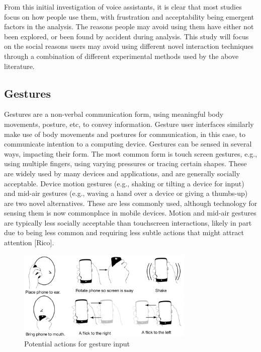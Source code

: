 \documentclass{l4proj}
\begin{document}
From this initial investigation of voice assistants, it is clear that most studies focus on how people use them, with frustration and acceptability being emergent factors in the analysis. The reasons people may avoid using them have either not been explored, or been found by accident during analysis. This study will focus on the social reasons users may avoid using different novel interaction techniques through a combination of different experimental methods used by the above literature.

\subsection{Gestures}

Gestures are a non-verbal communication form, using meaningful body movements, posture, etc, to convey information. Gesture user interfaces similarly make use of body movements and postures for communication, in this case, to communicate intention to a computing device. Gestures can be sensed in several ways, impacting their form. The most common form is touch screen gestures, e.g., using multiple fingers, using varying pressures or tracing certain shapes. These are widely used by many devices and applications, and are generally socially acceptable. Device motion gestures (e.g., shaking or tilting a device for input) and mid-air gestures (e.g., waving a hand over a device or giving a thumbs-up) are two novel alternatives. These are less commonly used, although technology for sensing them is now commonplace in mobile devices. Motion and mid-air gestures are typically less socially acceptable than touchscreen interactions, likely in part due to being less common and requiring less subtle actions that might attract attention [Rico].

\begin{figure}[!htb]
    \centering
    \includegraphics[width=0.75\textwidth]{images/gestures.png}
        \caption{Potential actions for gesture input}
        \label{fig:syn1}
\end{figure}
\end{document}
